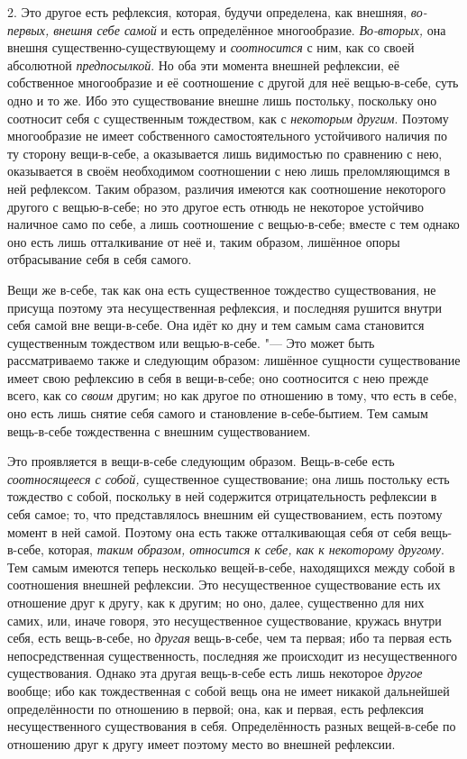 2. Это другое есть рефлексия, которая, будучи определена, как внешняя,
{\em во-первых, внешня себе самой} и есть определённое многообразие.
{\em Во-вторых,} она внешня существенно-существующему и
{\em соотносится} с ним, как со своей абсолютной
{\em предпосылкой}. Но оба эти момента внешней
рефлексии, её собственное многообразие и её соотношение с другой для неё
вещью-в-себе, суть одно и то же. Ибо это существование внешне лишь
постольку, поскольку оно соотносит себя с существенным тождеством, как с
{\em некоторым другим}. Поэтому многообразие не имеет
собственного самостоятельного устойчивого наличия по ту сторону
вещи-в-себе, а оказывается лишь видимостью по сравнению с нею, оказывается
в своём необходимом соотношении с нею лишь преломляющимся в ней рефлексом.
Таким образом, различия имеются как соотношение некоторого другого с
вещью-в-себе; но это другое есть отнюдь не некоторое устойчиво наличное
само по себе, а лишь соотношение с вещью-в-себе; вместе с тем однако оно
есть лишь отталкивание от неё и, таким образом, лишённое опоры отбрасывание
себя в себя самого.

Вещи же в-себе, так как она есть существенное тождество существования, не
присуща поэтому эта несущественная рефлексия, и последняя рушится внутри
себя самой вне вещи-в-себе. Она идёт ко дну и тем самым сама становится
существенным тождеством или вещью-в-себе. "--- Это может быть рассматриваемо
также и следующим образом: лишённое сущности существование имеет свою
рефлексию в себя в вещи-в-себе; оно соотносится с нею прежде всего, как со
{\em своим} другим; но как другое по отношению в тому,
что есть в себе, оно есть лишь снятие себя самого и становление
в-себе-бытием. Тем самым вещь-в-себе тождественна с внешним существованием.

Это проявляется в вещи-в-себе следующим образом. Вещь-в-себе есть
{\em соотносящееся с собой,} существенное
существование; она лишь постольку есть тождество с собой, поскольку в ней
содержится отрицательность рефлексии в себя самое; то, что представлялось
внешним ей существованием, есть поэтому момент в ней самой. Поэтому она
есть также отталкивающая себя от себя вещь-в-себе, которая,
{\em таким образом, относится к себе, как к некоторому
другому}. Тем самым имеются теперь несколько вещей-в-себе, находящихся
между собой в соотношения внешней рефлексии. Это несущественное
существование есть их отношение друг к другу, как к другим; но оно, далее,
существенно для них самих, или, иначе говоря, это несущественное
существование, кружась внутри себя, есть вещь-в-себе, но
{\em другая} вещь-в-себе, чем та первая; ибо та первая
есть непосредственная существенность, последняя же происходит из
несущественного существования. Однако эта другая вещь-в-себе есть лишь
некоторое {\em другое} вообще; ибо как тождественная с
собой вещь она не имеет никакой дальнейшей определённости по отношению в
первой; она, как и первая, есть рефлексия несущественного существования в
себя. Определённость разных вещей-в-себе по отношению друг к другу имеет
поэтому место во внешней рефлексии.

